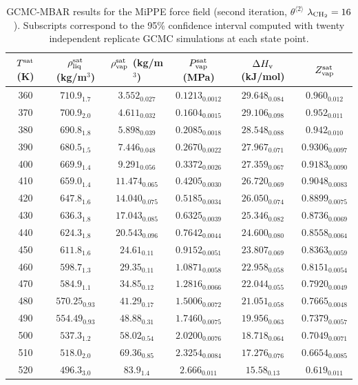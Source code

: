 \documentclass[journal=jctc,manuscript=article]{achemso}
\begin{document}
	\begin{table}[htb!]
		\caption{GCMC-MBAR results for the MiPPE force field (second iteration, $\theta^{\langle2\rangle}$ $\lambda_{\rm CH_2} = 16$). Subscripts correspond to the 95\% confidence interval computed with twenty independent replicate GCMC simulations at each state point.}
		\begin{center}
			\begin{tabular}{|c|c|c|c|c|c|}
				\hline
				$T^{\rm sat}$ (K) & $\rho_{\rm liq}^{\rm sat}$ (kg/m$^3$) & $\rho_{\rm vap}^{\rm sat}$ (kg/m$^3$) & $P_{\rm vap}^{\rm sat}$ (MPa) & $\Delta H_{\rm v}$ (kJ/mol) & $Z_{\rm vap}^{\rm sat}$ \\ \hline
				360 & $710.9_{1.7}$ & $3.552_{0.027}$ & $0.1213_{0.0012}$ & $29.648_{0.084}$ & $0.960_{0.012}$ \\
				370 & $700.9_{2.0}$ & $4.611_{0.032}$ & $0.1604_{0.0015}$ & $29.106_{0.098}$ & $0.952_{0.011}$ \\
				380 & $690.8_{1.8}$ & $5.898_{0.039}$ & $0.2085_{0.0018}$ & $28.548_{0.088}$ & $0.942_{0.010}$ \\
				390 & $680.5_{1.5}$ & $7.446_{0.048}$ & $0.2670_{0.0022}$ & $27.967_{0.071}$ & $0.9306_{0.0097}$ \\
				400 & $669.9_{1.4}$ & $9.291_{0.056}$ & $0.3372_{0.0026}$ & $27.359_{0.067}$ & $0.9183_{0.0090}$ \\
				410 & $659.0_{1.4}$ & $11.474_{0.065}$ & $0.4205_{0.0030}$ & $26.720_{0.069}$ & $0.9048_{0.0083}$ \\
				420 & $647.8_{1.6}$ & $14.040_{0.075}$ & $0.5185_{0.0034}$ & $26.050_{0.074}$ & $0.8899_{0.0075}$ \\
				430 & $636.3_{1.8}$ & $17.043_{0.085}$ & $0.6325_{0.0039}$ & $25.346_{0.082}$ & $0.8736_{0.0069}$ \\
				440 & $624.3_{1.8}$ & $20.543_{0.096}$ & $0.7642_{0.0044}$ & $24.600_{0.080}$ & $0.8558_{0.0064}$ \\
				450 & $611.8_{1.6}$ & $24.61_{0.11}$ & $0.9152_{0.0051}$ & $23.807_{0.069}$ & $0.8363_{0.0059}$ \\
				460 & $598.7_{1.3}$ & $29.35_{0.11}$ & $1.0871_{0.0058}$ & $22.958_{0.058}$ & $0.8151_{0.0054}$ \\
				470 & $584.9_{1.1}$ & $34.85_{0.12}$ & $1.2816_{0.0066}$ & $22.044_{0.055}$ & $0.7920_{0.0049}$ \\
				480 & $570.25_{0.93}$ & $41.29_{0.17}$ & $1.5006_{0.0072}$ & $21.051_{0.058}$ & $0.7665_{0.0048}$ \\
				490 & $554.49_{0.93}$ & $48.88_{0.31}$ & $1.7460_{0.0075}$ & $19.956_{0.063}$ & $0.7379_{0.0057}$ \\
				500 & $537.3_{1.2}$ & $58.02_{0.54}$ & $2.0200_{0.0076}$ & $18.718_{0.064}$ & $0.7049_{0.0071}$ \\
				510 & $518.0_{2.0}$ & $69.36_{0.85}$ & $2.3254_{0.0084}$ & $17.276_{0.076}$ & $0.6654_{0.0085}$ \\
				520 & $496.3_{3.0}$ & $83.9_{1.4}$ & $2.666_{0.011}$ & $15.58_{0.13}$ & $0.619_{0.011}$ \\
				\hline
			\end{tabular}
		\end{center}
	\end{table}
\end{document}
